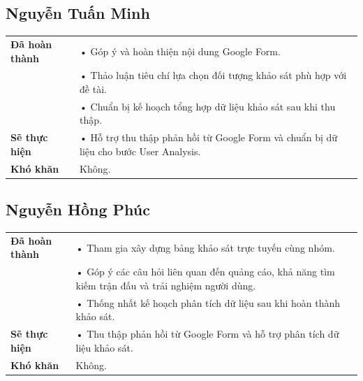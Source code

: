 \documentclass[11pt,a4paper]{article}
\begin{document}
\vspace{0.6cm}


\subsection*{Nguyễn Tuấn Minh}

\begin{tabularx}{\textwidth}{|p{4cm}|X|}
\hline
\textbf{Đã hoàn thành} &
• Góp ý và hoàn thiện nội dung Google Form.\\
&
• Thảo luận tiêu chí lựa chọn đối tượng khảo sát phù hợp với đề tài.\\
&
• Chuẩn bị kế hoạch tổng hợp dữ liệu khảo sát sau khi thu thập.\\
\hline

\textbf{Sẽ thực hiện} &
• Hỗ trợ thu thập phản hồi từ Google Form và chuẩn bị dữ liệu cho bước User Analysis.\\
\hline

\textbf{Khó khăn} &
Không.\\
\hline
\end{tabularx}

\vspace{0.6cm}


\subsection*{Nguyễn Hồng Phúc}

\begin{tabularx}{\textwidth}{|p{4cm}|X|}
\hline
\textbf{Đã hoàn thành} &
• Tham gia xây dựng bảng khảo sát trực tuyến cùng nhóm.\\
&
• Góp ý các câu hỏi liên quan đến quảng cáo, khả năng tìm kiếm trận đấu và trải nghiệm người dùng.\\
&
• Thống nhất kế hoạch phân tích dữ liệu sau khi hoàn thành khảo sát.\\
\hline

\textbf{Sẽ thực hiện} &
• Thu thập phản hồi từ Google Form và hỗ trợ phân tích dữ liệu khảo sát.\\
\hline

\textbf{Khó khăn} &
Không.\\
\hline
\end{tabularx}

\vspace{0.8cm}
\end{document}
